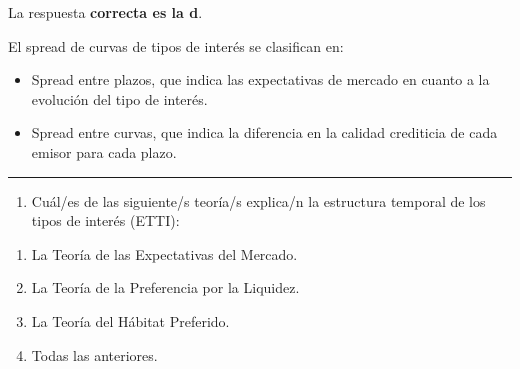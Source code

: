 \documentclass[
  letterpaper,
  DIV=11,
  numbers=noendperiod]{scrartcl}
\providecommand{\tightlist}{%
  \setlength{\itemsep}{0pt}\setlength{\parskip}{0pt}}\usepackage{longtable,booktabs,array}
\begin{document}
\begin{tcolorbox}[enhanced jigsaw, colframe=quarto-callout-note-color-frame, opacityback=0, colback=white, leftrule=.75mm, left=2mm, breakable, arc=.35mm, rightrule=.15mm, toprule=.15mm, bottomrule=.15mm]
\begin{minipage}[t]{5.5mm}
\textcolor{quarto-callout-note-color}{\faInfo}
\end{minipage}%
\begin{minipage}[t]{\textwidth - 5.5mm}

La respuesta \textbf{correcta es la d}.

El spread de curvas de tipos de interés se clasifican en:

\begin{itemize}
\item
  Spread entre plazos, que indica las expectativas de mercado en cuanto
  a la evolución del tipo de interés.
\item
  Spread entre curvas, que indica la diferencia en la calidad crediticia
  de cada emisor para cada plazo.
\end{itemize}

\end{minipage}%
\end{tcolorbox}

\begin{center}\rule{0.5\linewidth}{0.5pt}\end{center}

\begin{enumerate}
\def\labelenumi{\arabic{enumi}.}
\setcounter{enumi}{15}
\tightlist
\item
  Cuál/es de las siguiente/s teoría/s explica/n la estructura temporal
  de los tipos de interés (ETTI):
\end{enumerate}

\begin{enumerate}
\def\labelenumi{\alph{enumi}.}
\item
  La Teoría de las Expectativas del Mercado.
\item
  La Teoría de la Preferencia por la Liquidez.
\item
  La Teoría del Hábitat Preferido.
\item
  Todas las anteriores.
\end{enumerate}
\end{document}
